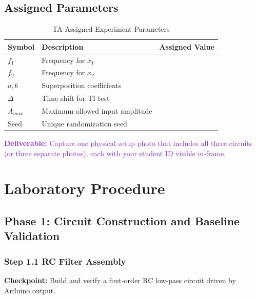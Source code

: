 \documentclass[11pt,letterpaper]{article}
\providecommand{\cpECE}[1]{\textcolor{OliveGreen}{\textbf{Checkpoint:} #1}}
\providecommand{\delECE}[1]{\textcolor{BlueViolet}{\textbf{Deliverable:} #1}}
\begin{document}
\subsection{Assigned Parameters}
\begin{table}[H]
    \centering
    \caption{TA-Assigned Experiment Parameters}
    \begin{tabularx}{\linewidth}{l X l}
    \toprule
    \textbf{Symbol} & \textbf{Description} & \textbf{Assigned Value}\\
    \midrule
    $f_1$ & Frequency for $x_1$ & \underline{\hspace{2.5cm}}\\
    $f_2$ & Frequency for $x_2$ & \underline{\hspace{2.5cm}}\\
    $a,b$ & Superposition coefficients & \underline{\hspace{2.5cm}}\\
    $\Delta$ & Time shift for TI test & \underline{\hspace{2.5cm}}\\
    $A_{max}$ & Maximum allowed input amplitude & \underline{\hspace{2.5cm}}\\
    Seed & Unique randomization seed & \underline{\hspace{2.5cm}}\\
    \bottomrule
    \end{tabularx}
\end{table}

\delECE{Capture one physical setup photo that includes all three circuits (or three separate photos), each with your student ID visible in-frame.}

\clearpage

\clearpage

\section{Laboratory Procedure}

\subsection{Phase 1: Circuit Construction and Baseline Validation}

\subsubsection{Step 1.1 RC Filter Assembly}
\cpECE{Build and verify a first-order RC low-pass circuit driven by Arduino output.}
\end{document}
